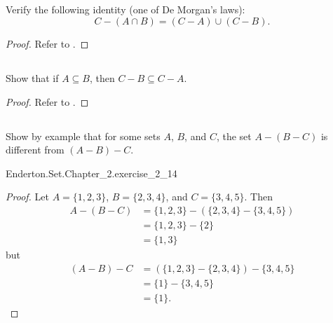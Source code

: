 \documentclass{report}
\begin{document}
\subsection{}%

  Verify the following identity (one of De Morgan's laws):
    $$C - (A \cap B) = (C - A) \cup (C - B).$$

  \begin{proof}
    Refer to .
  \end{proof}

\subsection{}%

  Show that if $A \subseteq B$, then $C - B \subseteq C - A$.

  \begin{proof}
    Refer to .
  \end{proof}

\subsection{}%

  Show by example that for some sets $A$, $B$, and $C$, the set $A - (B - C)$ is
    different from $(A - B) - C$.

    {Enderton.Set.Chapter\_2.exercise\_2\_14}

  \begin{proof}
    Let $A = \{1, 2, 3\}$, $B = \{2, 3, 4\}$, and $C = \{3, 4, 5\}$.
    Then
      \begin{align*}
        A - (B - C)
          & = \{1, 2, 3\} - (\{2, 3, 4\} - \{3, 4, 5\}) \\
          & = \{1, 2, 3\} - \{2\} \\
          & = \{1, 3\}
      \end{align*}
      but
      \begin{align*}
        (A - B) - C
          & = (\{1, 2, 3\} - \{2, 3, 4\}) - \{3, 4, 5\} \\
          & = \{1\} - \{3, 4, 5\} \\
          & = \{1\}.
      \end{align*}
  \end{proof}
\end{document}
